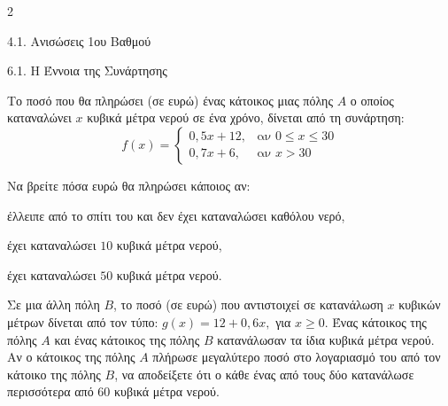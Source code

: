 \begin{ylh}{2}
    \item 4.1. Ανισώσεις 1ου Βαθμού
    \item 6.1. Η Έννοια της Συνάρτησης
\end{ylh}
Το ποσό που θα πληρώσει (σε ευρώ) ένας κάτοικος μιας πόλης $A$ ο οποίος καταναλώνει $x$ κυβικά μέτρα νερού σε ένα χρόνο, δίνεται από τη συνάρτηση:
\[ f(x) = \begin{cases} 0,5x + 12, & \text{αν } 0 \le x \le 30 \\ 0,7x + 6, & \text{αν } x > 30 \end{cases} \]
\begin{alist}
\item Να βρείτε πόσα ευρώ θα πληρώσει κάποιος αν:
\begin{rlist}
\item
  έλλειπε από το σπίτι του και δεν έχει καταναλώσει καθόλου νερό,
\item
  έχει καταναλώσει $10$ κυβικά μέτρα νερού,
\item
  έχει καταναλώσει $50$ κυβικά μέτρα νερού.
\end{rlist}
\item Σε μια άλλη πόλη $B$, το ποσό (σε ευρώ) που αντιστοιχεί σε κατανάλωση $x$ κυβικών μέτρων δίνεται από τον τύπο: $g(x) = 12 + 0,6x,$ για $x \geq 0$.
Ένας κάτοικος της πόλης $A$ και ένας κάτοικος της πόλης $B$ κατανάλωσαν τα ίδια κυβικά μέτρα νερού. Αν ο κάτοικος της πόλης $A$ πλήρωσε μεγαλύτερο ποσό στο λογαριασμό του από τον κάτοικο της πόλης $B$, να αποδείξετε ότι ο κάθε ένας από τους δύο κατανάλωσε περισσότερα από $60$ κυβικά μέτρα νερού.
\end{alist}

